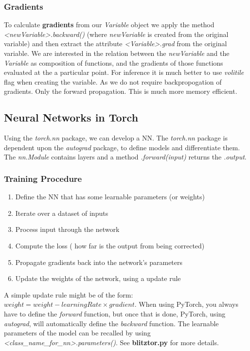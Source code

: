 \documentclass[]{report}
\newcommand{\tif}{\textit}
\newcommand{\tbf}{\textbf}
\begin{document}
\subsubsection{Gradients}

To calculate \textbf{gradients} from our \textit{Variable} object we apply the method \textit{<newVariable>.backward()} (where \textit{newVariable} is created from the original variable) and then extract the attribute \textit{<Variable>.grad} from the original variable. We are interested in the relation between the \textit{newVariable} and the \textit{Variable} as composition of functions, and the gradients of those functions evaluated at the a particular point. For inference it is much better to use \tif{volitile} flag when creating the variable. As we do not require backpropogation of gradients. Only the forward propagation. This is much more memory efficient. 


\subsection{Neural Networks in Torch}

Using the \textit{torch.nn} package, we can develop a NN. The \textit{torch.nn} package is dependent upon the \textit{autograd} package, to define models and differentiate them.  The \tif{nn.Module} contains layers and a method \tif{.forward(input)} returns the \tif{.output}. 

\subsubsection{Training Procedure}
\begin{enumerate}
	\item Define the NN that has some learnable parameters (or weights) 
	\item Iterate over a dataset of inputs
	\item Process input through the network
	\item Compute the loss ( how far is the output from being corrected)
	\item Propagate gradients back into the network's parameters
	\item Update the weights of the network, using a update rule
\end{enumerate} 

A simple update rule might be of the form: $weight = weight - learningRate \times gradient$. When using PyTorch, you always have to define the \tif{forward} function, but once that is done, PyTorch, using \tif{autograd}, will automatically define the \tif{backward} function.  The learnable parameters of the model can be recalled by using \textit{<class\_name\_for\_nn>.parameters()}. See \tbf{blitztor.py} for more details.\\
\end{document}
